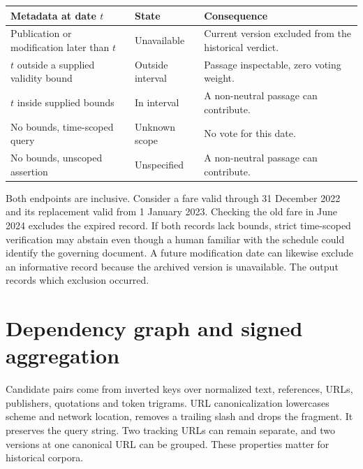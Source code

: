 \begin{center}\small
\begin{tabularx}{\linewidth}{@{}p{.32\linewidth}XX@{}}\toprule
Metadata at date $t$ & State & Consequence\\\midrule
Publication or modification later than $t$ & Unavailable & Current version excluded from the historical verdict.\\
$t$ outside a supplied validity bound & Outside interval & Passage inspectable, zero voting weight.\\
$t$ inside supplied bounds & In interval & A non-neutral passage can contribute.\\
No bounds, time-scoped query & Unknown scope & No vote for this date.\\
No bounds, unscoped assertion & Unspecified & A non-neutral passage can contribute.\\\bottomrule
\end{tabularx}
\end{center}
Both endpoints are inclusive. Consider a fare valid through 31 December 2022 and its replacement valid from 1 January 2023. Checking the old fare in June 2024 excludes the expired record. If both records lack bounds, strict time-scoped verification may abstain even though a human familiar with the schedule could identify the governing document. A future modification date can likewise exclude an informative record because the archived version is unavailable. The output records which exclusion occurred.

\section{Dependency graph and signed aggregation}
Candidate pairs come from inverted keys over normalized text, references, URLs, publishers, quotations and token trigrams. URL canonicalization lowercases scheme and network location, removes a trailing slash and drops the fragment. It preserves the query string. Two tracking URLs can remain separate, and two versions at one canonical URL can be grouped. These properties matter for historical corpora.

